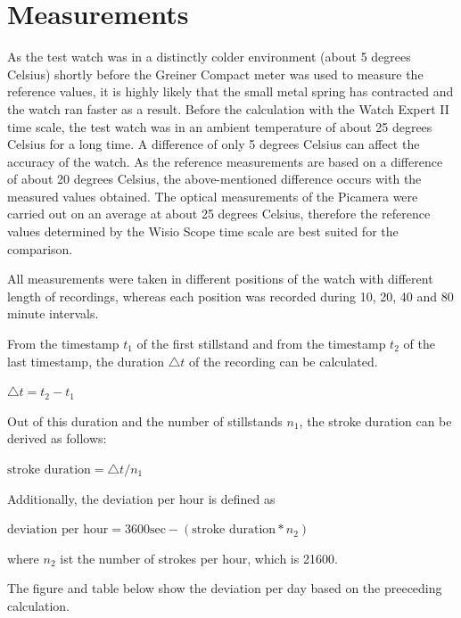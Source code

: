 \documentclass[12pt, a4paper]{report}
\begin{document}
    \section{Measurements}
As the test watch was in a distinctly colder environment (about 5 degrees Celsius) shortly before the Greiner Compact meter was used to measure the reference values, it is highly likely that the small metal spring has contracted and the watch ran faster as a result. Before the calculation with the Watch Expert II time scale, the test watch was in an ambient temperature of about 25 degrees Celsius for a long time. A difference of only 5 degrees Celsius can affect the accuracy of the watch\cite{Witschi_basics}. As the reference measurements are based on a difference of about 20 degrees Celsius, the above-mentioned difference occurs with the measured values obtained.
The optical measurements of the Picamera were carried out on an average at about 25 degrees Celsius, therefore the reference values determined by the Wisio Scope time scale are best suited for the comparison.

    All measurements were taken in different positions of the watch with different length
    of recordings, whereas each position was recorded during 10, 20, 40 and 80 minute intervals.
\newline

From the timestamp $t_1$ of the first stillstand and from the timestamp $t_2$ of the last timestamp, the duration $\triangle t$ of the recording can be calculated.
    \bigskip
    \begin{center}
    \(\triangle t = t_2-t_1\)
    \end{center}
     \bigskip
    
Out of this duration and the number of stillstands $n_1$, the stroke duration can be derived as follows:
    \bigskip
        \begin{center}
	\( \text{stroke duration} = \triangle t / n_1 \)
	    \end{center}
	\bigskip

Additionally, the deviation per hour is defined as 
  \bigskip
        \begin{center}
    \(\text{deviation per hour} = 3600\text{sec}-(\text{stroke duration}*n_2)\)
        
    \end{center}
        \bigskip
where $n_2$ ist the number of strokes per hour, which is 21600.

    The figure and table below show the deviation per day based on the preeceding calculation.
\end{document}
